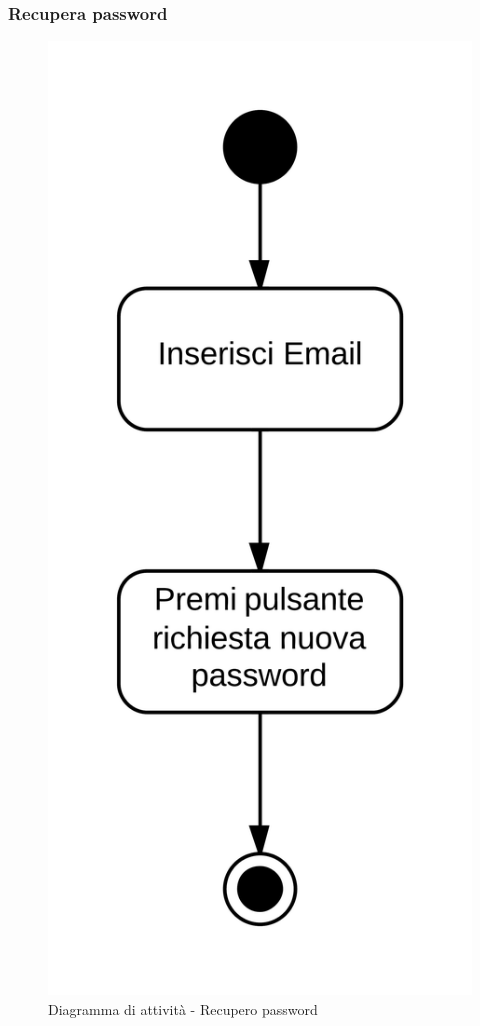 \subsubsection{Recupera password}

\begin{figure}[H]
\centering
\includegraphics[scale=0.05]{uml/attivita/MaaP - Recupera password.png}
\caption{Diagramma di attività - Recupero password}
\end{figure}

